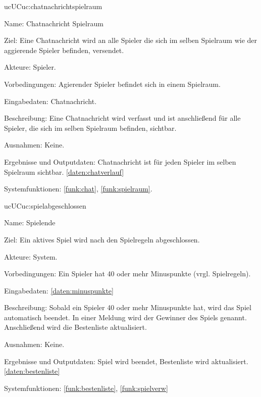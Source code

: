 \begin{description}[leftmargin=5em, style=sameline]
	\begin{lhp}{uc}{UC}{uc:chatnachrichtspielraum}
		\item [Name:]Chatnachricht Spielraum
		\item [Ziel:]Eine Chatnachricht wird an alle Spieler die sich im selben Spielraum wie der aggierende Spieler befinden, versendet.
		\item [Akteure:]Spieler. 
		\item [Vorbedingungen:]Agierender Spieler befindet sich in einem Spielraum.
		\item [Eingabedaten:]Chatnachricht.
		\item [Beschreibung:]Eine Chatnachricht wird verfasst und ist anschließend für alle Spieler, die sich im selben Spielraum befinden, sichtbar.
		\item [Ausnahmen:]Keine.
		\item [Ergebnisse und Outputdaten:] Chatnachricht ist für jeden Spieler im selben Spielraum sichtbar. \ref{daten:chatverlauf}
		\item [Systemfunktionen:]  \ref{funk:chat}, \ref{funk:spielraum}.
	\end{lhp}
	
	\begin{lhp}{uc}{UC}{uc:spielabgeschlossen}
		\item [Name:]Spielende
		\item [Ziel:]Ein aktives Spiel wird nach den Spielregeln abgeschlossen.
		\item [Akteure:]System.
		\item [Vorbedingungen:] Ein Spieler hat 40 oder mehr Minuspunkte (vrgl. Spielregeln).
		\item [Eingabedaten:] \ref{daten:minuspunkte}
		\item [Beschreibung:] Sobald ein Spieler 40 oder mehr Minuspunkte hat, wird das Spiel automatisch beendet. In einer Meldung wird der Gewinner des Spiels genannt. Anschließend wird die Bestenliste aktualisiert.
		\item [Ausnahmen:]Keine.
		\item [Ergebnisse und Outputdaten:]Spiel wird beendet, Bestenliste wird aktualisiert.\ref{daten:bestenliste}
		\item [Systemfunktionen:] \ref{funk:bestenliste}, \ref{funk:spielverw}
	\end{lhp}
	

\end{description}
